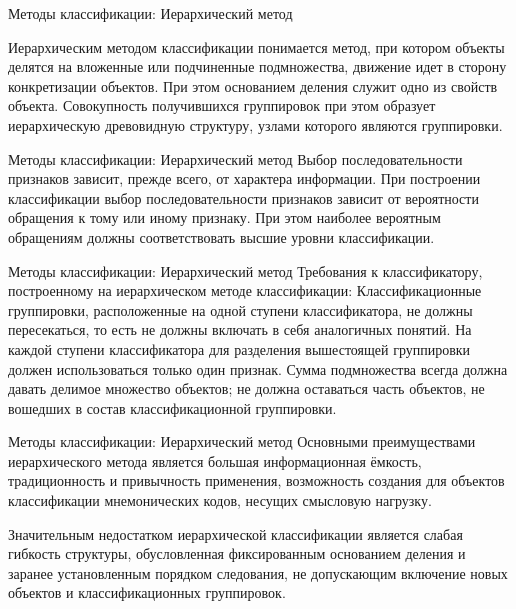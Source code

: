 \documentclass{beamer}
\begin{document}
\begin{frame}{Методы классификации: Иерархический метод} 

Иерархическим методом классификации понимается метод, при котором  объекты делятся  
на вложенные или подчиненные подмножества, движение идет в сторону конкретизации 
объектов. При этом основанием деления служит  одно из свойств объекта. 
Совокупность получившихся группировок при этом образует иерархическую древовидную структуру, узлами которого являются группировки.
\end{frame}

\begin{frame}{Методы классификации: Иерархический метод} 
Выбор последовательности признаков зависит, прежде всего, от характера информации. 
При построении классификации выбор последовательности признаков зависит 
от вероятности обращения к тому или иному признаку. 
При этом наиболее вероятным обращениям должны соответствовать высшие уровни классификации.
\end{frame}

\begin{frame}{Методы классификации: Иерархический метод} 
Требования к классификатору, построенному на иерархическом методе классификации: Классификационные группировки, расположенные на одной ступени классификатора, не должны 
пересекаться, то есть не должны включать в себя аналогичных понятий. На каждой ступени классификатора для разделения вышестоящей группировки должен использоваться только 
один признак. Сумма подмножества всегда должна давать делимое множество объектов; не должна оставаться часть объектов, не вошедших в состав классификационной группировки.
\end{frame}

\begin{frame}{Методы классификации: Иерархический метод} 
Основными преимуществами иерархического метода является большая информационная ёмкость, 
традиционность и привычность применения, возможность создания для объектов классификации
мнемонических кодов, несущих смысловую нагрузку.

Значительным недостатком иерархической классификации является слабая гибкость структуры, 
обусловленная фиксированным основанием деления и заранее установленным порядком следования, не допускающим включение новых объектов и классификационных группировок.  


\end{frame}
\end{document}
